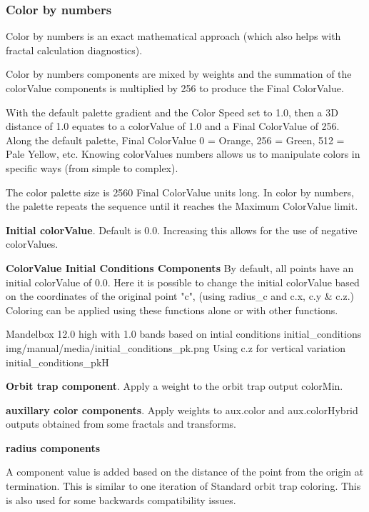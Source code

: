 \subsubsection{Color by numbers}\label{materials-color-by-numbers}

Color by numbers is an exact mathematical approach (which also helps with fractal calculation diagnostics).

Color by numbers components are mixed by weights and the summation of the colorValue components is multiplied by 256 to produce the Final ColorValue.

With the default palette gradient and the Color Speed set to 1.0, then a 3D distance of 1.0 equates to a colorValue of 1.0 and a Final ColorValue of 256. Along the default palette, Final ColorValue 0 = Orange, 256 = Green, 512 = Pale Yellow, etc.
Knowing colorValues numbers allows us to manipulate colors in specific ways (from simple to complex).

The color palette size is 2560 Final ColorValue units long. In color by numbers, the palette repeats the sequence until it reaches the Maximum ColorValue limit.

\textbf{Initial colorValue}. Default is 0.0. Increasing this allows for the use of negative colorValues.

\textbf{ColorValue Initial Conditions Components}
By default, all points have an initial colorValue of 0.0. Here it is possible to change the initial colorValue  based on the coordinates of the original point "c", (using radius\_c and c.x, c.y \& c.z.) Coloring can be applied using these functions alone or with other functions.

{Mandelbox 12.0 high with 1.0 bands based on intial conditions}
{initial_conditions}
{img/manual/media/initial_conditions_pk.png}
{Using c.z for vertical variation}
{initial_conditions_pk}{H}

\textbf{Orbit trap component}. Apply a weight to the orbit trap output colorMin.

\textbf{auxillary color components}. Apply weights to aux.color and aux.colorHybrid outputs obtained from some fractals and transforms.

\textbf{radius components} 

A component value is added based on the distance of the point from the origin at termination.
This is similar to one iteration of Standard orbit trap coloring. This is also used for some backwards compatibility issues.

